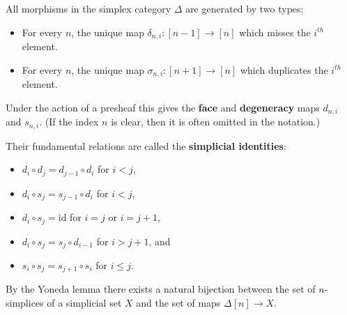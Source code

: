     \begin{property}
        All morphisms in the simplex category $\Delta$ are generated by two types:
        \begin{itemize}
            \item For every $n$, the unique map $\delta_{n, i}:[n-1]\rightarrow[n]$ which misses the $i^{th}$ element.
            \item For every $n$, the unique map $\sigma_{n, i}:[n+1]\rightarrow[n]$ which duplicates the $i^{th}$ element.
        \end{itemize}
        Under the action of a presheaf this gives the \textbf{face} and \textbf{degeneracy} maps $d_{n, i}$ and $s_{n, i}$. (If the index $n$ is clear, then it is often omitted in the notation.)

        Their fundamental relations are called the \textbf{simplicial identities}:
        \begin{itemize}
            \item $d_i\circ d_j = d_{j-1}\circ d_i$ for $i<j$,
            \item $d_i\circ s_j = s_{j-1}\circ d_i$ for $i<j$,
            \item $d_i\circ s_j = \text{id}$ for $i=j$ or $i=j+1$,
            \item $d_i\circ s_j = s_j\circ d_{i-1}$ for $i>j+1$, and
            \item $s_i\circ s_j = s_{j+1}\circ s_i$ for $i\leq j$.
        \end{itemize}
    \end{property}

    \begin{property}
        By the Yoneda lemma there exists a natural bijection between the set of $n$-simplices of a simplicial set $X$ and the set of maps $\Delta[n]\rightarrow X$.
    \end{property}

